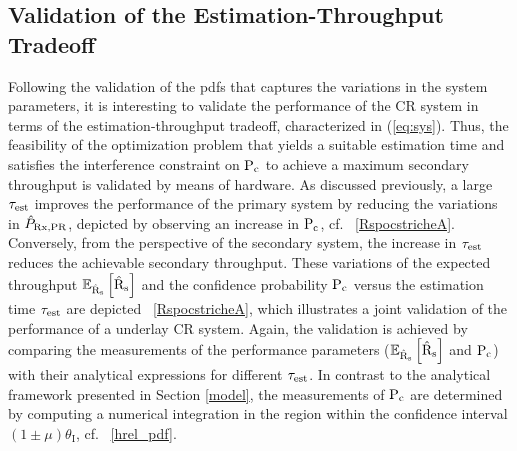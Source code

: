 \subsection{Validation of the Estimation-Throughput Tradeoff}
Following the validation of the pdfs that captures the variations in the system parameters, it is interesting to validate the performance of the CR system in terms of the estimation-throughput tradeoff, characterized in (\ref{eq:sys}). Thus, the feasibility of the optimization problem that yields a suitable estimation time and satisfies the interference constraint on $\text{P}_{\text{c}}$ to achieve a maximum secondary throughput is validated by means of hardware. As discussed previously, a large $\tau_{\text{est}}$ improves the performance of the primary system by reducing the variations in $\hat{P}_{\text{Rx,PR}}$, depicted by observing an increase in $\text{P}_{\text{c}}$, cf. \figurename~\ref{RspocstricheA}. Conversely, from the perspective of the secondary system, the increase in $\tau_{\text{est}}$ reduces the achievable secondary throughput. These variations of the expected throughput ${\mathbb E}_{\hat{\text{{R}}}_{\text{s}}}\left[ \hat{\text{{R}}}_{\text{s}} \right]$ and the confidence probability $\text{P}_{\text{c}}$ versus the estimation time $\tau_{\text{est}}$ are depicted \figurename~\ref{RspocstricheA}, which illustrates a joint validation of the performance of a underlay CR system. Again, the validation is achieved by comparing the measurements of the performance parameters (${\mathbb E}_{\hat{\text{{R}}}_{\text{s}}}\left[ \hat{\text{{R}}}_{\text{s}} \right]$ and $\text{P}_{\text{c}}$) with their analytical expressions for different $\tau_{\text{est}}$. In contrast to the analytical framework presented in Section \ref{model}, the measurements of $\text{P}_{\text{c}}$ are determined by computing a numerical integration in the region within the confidence interval $(1  \pm \mu)  \theta_\textrm{I}$, cf. \figurename~\ref{hrel_pdf}. 
